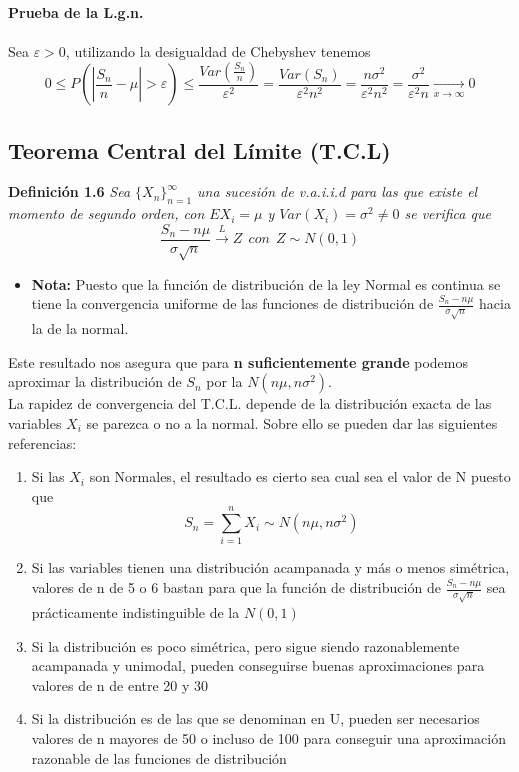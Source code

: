 	\textbf{Prueba de la L.g.n.}\\ \ \\
	Sea $\varepsilon>0$, utilizando la desigualdad de Chebyshev tenemos $$0\leq P(|\frac{S_n}{n}-\mu|>\varepsilon)\leq \frac{Var(\frac{S_n}{n})}{\varepsilon^{2}}=\frac{Var(S_n)}{\varepsilon^{2}n^{2}}=\frac{n\sigma^{2}}{\varepsilon^{2}n^{2}}=\frac{\sigma^{2}}{\varepsilon^{2}n}\xrightarrow[x\longrightarrow\infty]{}0$$\pagebreak
	
	
	\subsection{Teorema Central del Límite (T.C.L)}
	
	\noindent \textbf{Definición 1.6} \textit{Sea $\{X_n\}^{\infty}_{n=1}$ una sucesión de v.a.i.i.d para las que existe el momento de segundo orden, con  $EX_i=\mu$ y $Var(X_i)=\sigma^{2}\neq 0$ se verifica que} $$\frac{S_n-n\mu}{\sigma\sqrt{n}}\xrightarrow{L}Z \ \ con\ \ Z\sim N(0,1)$$
	\begin{itemize}
		\item \textbf{Nota: }Puesto que la función de distribución de la ley Normal es continua se tiene la convergencia uniforme de las funciones de distribución de $\frac{S_n-n\mu}{\sigma\sqrt{n}}$ hacia la de la normal.
	\end{itemize}
	Este resultado nos asegura que para \textbf{n suficientemente grande} podemos aproximar la distribución de $S_n$ por la $N(n\mu, n\sigma^{2})$.\\
	La rapidez de convergencia del T.C.L. depende de la distribución exacta de las variables $X_i$ se parezca o no a la normal. Sobre ello se pueden dar las siguientes referencias:
	\begin{enumerate}
		\item Si las $X_i$ son Normales, el resultado es cierto sea cual sea el valor de N puesto que $$S_n=\sum_{i=1}^n X_i \sim N(n\mu, n\sigma^{2})$$
		
		\item Si las variables tienen una distribución acampanada y más o menos simétrica, valores de n de 5 o 6 bastan para que la función de distribución de $\frac{S_n-n\mu}{\sigma\sqrt{n}}$ sea prácticamente indistinguible de la $N(0,1)$
		
		\item Si la distribución es poco simétrica, pero sigue siendo razonablemente acampanada y unimodal, pueden conseguirse buenas aproximaciones para valores de n de entre 20 y 30
		
		\item Si la distribución es de las que se denominan en U, pueden ser necesarios valores de n mayores de 50 o incluso de 100 para conseguir una aproximación razonable de las funciones de distribución
	\end{enumerate}

